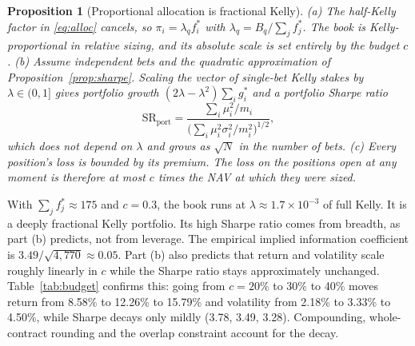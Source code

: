 \documentclass[11pt]{article}
\newtheorem{proposition}{Proposition}
\theoremstyle{definition}
\newcommand{\1}{\mathbf{1}}
\begin{document}
\begin{proposition}[Proportional allocation is fractional Kelly]\label{prop:fractional}
(a) The half-Kelly factor in \eqref{eq:alloc} cancels, so $\pi_i=\lambda_q f^\ast_i$ with
$\lambda_q=B_q/\sum_j f^\ast_j$. The book is Kelly-proportional in \emph{relative} sizing,
and its absolute scale is set entirely by the budget $c$.
(b) Assume independent bets and the quadratic approximation of
Proposition~\ref{prop:sharpe}. Scaling the vector of single-bet Kelly stakes by
$\lambda\in(0,1]$ gives portfolio growth $(2\lambda-\lambda^2)\sum_i g^\ast_i$ and a portfolio
Sharpe ratio
\begin{equation}
  \mathrm{SR}_{\text{port}}=\frac{\sum_i \mu_i^2/m_i}{\big(\sum_i \mu_i^2\sigma_i^2/m_i^2\big)^{1/2}},
\end{equation}
which does not depend on $\lambda$ and grows as $\sqrt{N}$ in the number of bets.
(c) Every position's loss is bounded by its premium. The loss on the positions open at any
moment is therefore at most $c$ times the NAV at which they were sized.
\end{proposition}

\noindent With $\sum_j f^\ast_j\approx 175$ and $c=0.3$, the book runs at
$\lambda\approx 1.7\times10^{-3}$ of full Kelly. It is a deeply fractional Kelly portfolio.
Its high Sharpe ratio comes from breadth, as part (b) predicts, not from leverage. The
empirical implied information coefficient is $3.49/\sqrt{4{,}770}\approx 0.05$. Part (b)
also predicts that return and volatility scale roughly linearly in $c$ while the Sharpe
ratio stays approximately unchanged. Table~\ref{tab:budget} confirms this: going from
$c=20\%$ to 30\% to 40\% moves return from 8.58\% to 12.26\% to 15.79\% and volatility
from 2.18\% to 3.33\% to 4.50\%, while Sharpe decays only mildly (3.78, 3.49, 3.28).
Compounding, whole-contract rounding and the overlap constraint account for the decay.
\end{document}
